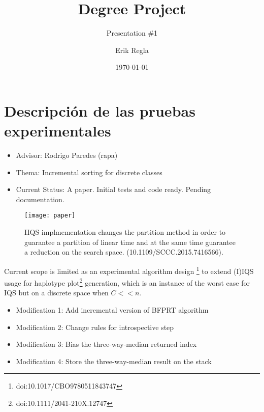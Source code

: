 \documentclass{beamer}
\title[Degree Project]{Degree Project}
\subtitle{Presentation \#1}
\author[E. Regla]{Erik Regla}
\institute[UTalca]{Universidad de Talca}
\date{\today}
\begin{document}
\begin{frame}
  \titlepage
\end{frame}

\section{Descripción de las pruebas experimentales}

\begin{frame}
  \begin{itemize}
  	\item Advisor: Rodrigo Paredes (rapa)
  	\item Thema: Incremental sorting for discrete classes
  	\item Current Status: A paper. Initial tests and code ready. Pending documentation.
  \end{itemize}
\end{frame}


\begin{frame}
    \centering
    \begin{figure}
        \texttt{[image: paper]}\\
        \caption{IIQS implmementation changes the partition method in order to guarantee a partition of linear time and at the same time guarantee a reduction on the search space. (10.1109/SCCC.2015.7416566).}
    \end{figure}
\end{frame}


\begin{frame}
    Current scope is limited as an experimental algorithm design \footnote{doi:10.1017/CBO9780511843747} to extend (I)IQS usage for haplotype plot\footnote{doi:10.1111/2041-210X.12747} generation, which is an instance of the worst case for IQS but on a discrete space when $C<<n$.\\
\begin{itemize}
    \item Modification 1: Add incremental version of BFPRT algorithm%
    \item Modification 2: Change rules for introspective step%
    \item Modification 3: Bias the three-way-median returned index%
    \item Modification 4: Store the three-way-median result on the stack
\end{itemize}
\end{frame}
\end{document}
